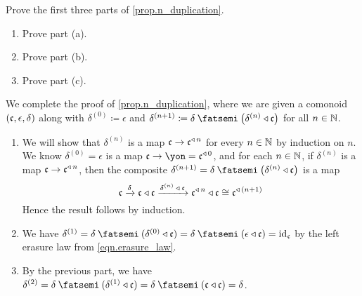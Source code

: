 \documentclass[Book-Poly]{subfiles}
\begin{document}
\begin{exercise} \label{exc.n_duplication}
Prove the first three parts of \cref{prop.n_duplication}. %
\begin{enumerate}
    \item Prove part (a).
    \item Prove part (b).
    \item Prove part (c).\qedhere
\end{enumerate}
\begin{solution}
We complete the proof of \cref{prop.n_duplication}, where we are given a comonoid $(\mathfrak{c},\epsilon,\delta)$ along with $\delta^{(0)}\coloneqq\epsilon$ and $\delta^{(n+1)}\coloneqq\delta\then\left(\delta^{(n)}\tri\car{c}\right)$ for all $n\in\mathbb{N}$.
\begin{enumerate}
    \item We will show that $\delta^{(n)}$ is a map $\mathfrak{c}\to\mathfrak{c}^{\mathbin{\triangleleft}\,n}$ for every $n\in\mathbb{N}$ by induction on $n$.
    We know $\delta^{(0)}=\epsilon$ is a map $\car{c}\to\yon=\car{c}\tripow0$, and for each $n\in\mathbb{N}$, if $\delta^{(n)}$ is a map $\mathfrak{c}\to\mathfrak{c}^{\mathbin{\triangleleft}\,n}$, then the composite $\delta^{(n+1)}=\delta\then\left(\delta^{(n)}\tri\car{c}\right)$ is a map
    \[
        \mathfrak{c}\xrightarrow{\delta}\mathfrak{c}\mathbin{\triangleleft}\mathfrak{c}\xrightarrow{\delta^{(n)}\:\mathbin{\triangleleft}\:\mathfrak{c}}\mathfrak{c}^{\mathbin{\triangleleft}\,n}\mathbin{\triangleleft}\mathfrak{c}\cong\mathfrak{c}^{\mathbin{\triangleleft}\,(n+1)}
    \]
    Hence the result follows by induction.
    
    \item We have $\delta^{(1)}=\delta\then(\delta^{(0)}\tri\car{c})=\delta\then(\epsilon\tri\car{c})=\id_\car{c}$ by the left erasure law from \eqref{eqn.erasure_law}.
    
    \item By the previous part, we have $\delta^{(2)}=\delta\then(\delta^{(1)}\tri\car{c})=\delta\then(\car{c}\tri\car{c})=\delta$.
\end{enumerate}
\end{solution}
\end{exercise}
\end{document}

